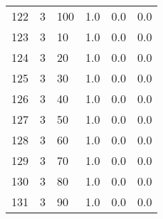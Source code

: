 \documentclass{article}
\begin{document}
{\begin{tabular}{llllll}
122 &         3 &        100 &              1.0 &                       0.0 &                                   0.0 \\
123 &         3 &         10 &              1.0 &                       0.0 &                                   0.0 \\
124 &         3 &         20 &              1.0 &                       0.0 &                                   0.0 \\
125 &         3 &         30 &              1.0 &                       0.0 &                                   0.0 \\
126 &         3 &         40 &              1.0 &                       0.0 &                                   0.0 \\
127 &         3 &         50 &              1.0 &                       0.0 &                                   0.0 \\
128 &         3 &         60 &              1.0 &                       0.0 &                                   0.0 \\
129 &         3 &         70 &              1.0 &                       0.0 &                                   0.0 \\
130 &         3 &         80 &              1.0 &                       0.0 &                                   0.0 \\
131 &         3 &         90 &              1.0 &                       0.0 &                                   0.0 \\
\bottomrule
\end{tabular}
}
\newpage
\end{document}
